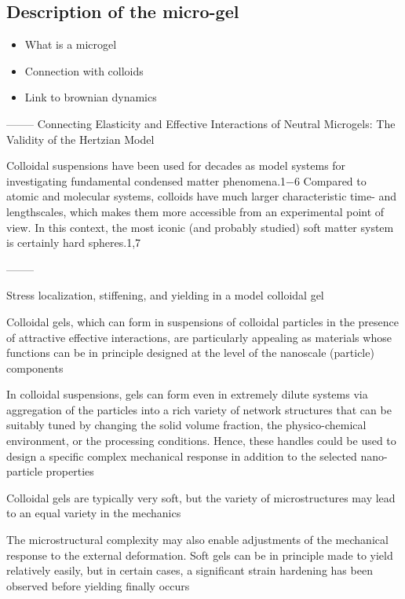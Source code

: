 \documentclass[../../main-notes.tex]{subfiles}
\begin{document}
\subsection{Description of the micro-gel}

\begin{itemize}
    \item What is a microgel
    \item Connection with colloids 
    \item Link to brownian dynamics
\end{itemize}

--------
Connecting Elasticity and Effective Interactions of Neutral Microgels: The Validity of the Hertzian Model\citep{rovigattiConnectingElasticityEffective2019}

Colloidal suspensions have been used for decades as model systems for investigating fundamental condensed matter  phenomena.1−6 Compared to atomic and molecular systems, colloids have much larger characteristic time- and lengthscales, which makes them more accessible from an experimental point of view. In this context, the most iconic (and probably studied) soft matter system is certainly hard  spheres.1,7


--------

Stress localization, stiffening, and yielding in a model colloidal gel\citep{colomboStressLocalizationStiffening2014}

Colloidal gels, which can form in suspensions of colloidal particles in the presence of attractive effective interactions, are particularly appealing as materials whose functions can be in principle designed at the level of the nanoscale (particle) components

In colloidal suspensions, gels can form even in extremely dilute systems via aggregation of the particles into a rich variety of network structures that can be suitably tuned by changing the solid volume fraction, the physico-chemical environment, or the processing conditions. Hence, these handles could be used to design a specific complex mechanical response in addition to the selected nano-particle properties

Colloidal gels are typically very soft, but the variety of microstructures may lead to an equal variety in the mechanics

The microstructural complexity may also enable adjustments of the mechanical response to the external deformation. Soft gels can be in principle made to yield relatively easily, but in certain cases, a significant strain hardening has been observed before yielding finally occurs
\end{document}
